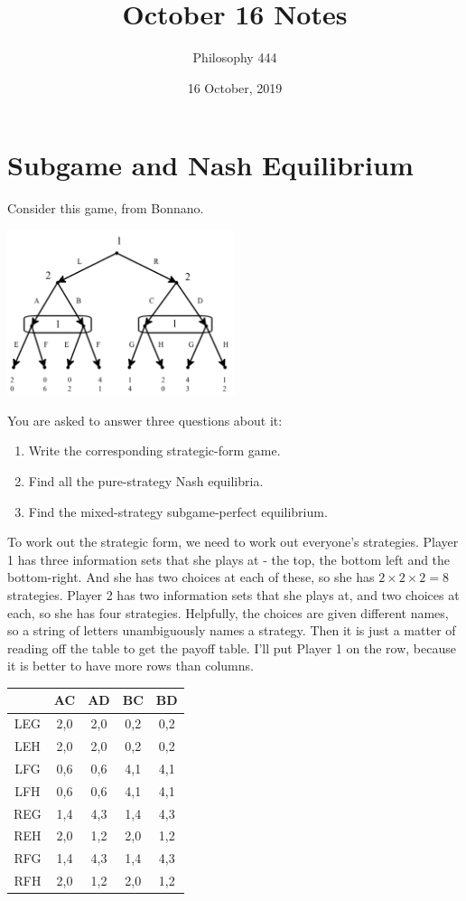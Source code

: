 \documentclass[11pt,]{article}
\title{October 16 Notes}
\author{Philosophy 444}
\date{16 October, 2019}
\providecommand{\tightlist}{%
  \setlength{\itemsep}{0pt}\setlength{\parskip}{0pt}}
\begin{document}
\maketitle

\hypertarget{subgame-and-nash-equilibrium}{%
\section{Subgame and Nash
Equilibrium}\label{subgame-and-nash-equilibrium}}

Consider this game, from Bonnano.

\includegraphics[width=0.5\textwidth,height=\textheight]{exercise7_7.png}

You are asked to answer three questions about it:

\begin{enumerate}
\def\labelenumi{(\alph{enumi})}
\tightlist
\item
  Write the corresponding strategic-form game.
\item
  Find all the pure-strategy Nash equilibria.
\item
  Find the mixed-strategy subgame-perfect equilibrium.
\end{enumerate}

To work out the strategic form, we need to work out everyone's
strategies. Player 1 has three information sets that she plays at - the
top, the bottom left and the bottom-right. And she has two choices at
each of these, so she has \(2 \times 2 \times 2 = 8\) strategies. Player
2 has two information sets that she plays at, and two choices at each,
so she has four strategies. Helpfully, the choices are given different
names, so a string of letters unambiguously names a strategy. Then it is
just a matter of reading off the table to get the payoff table. I'll put
Player 1 on the row, because it is better to have more rows than
columns.

\begin{longtable}[]{@{}ccccc@{}}
\toprule
& AC & AD & BC & BD\tabularnewline
\midrule
\endhead
LEG & 2,0 & 2,0 & 0,2 & 0,2\tabularnewline
LEH & 2,0 & 2,0 & 0,2 & 0,2\tabularnewline
LFG & 0,6 & 0,6 & 4,1 & 4,1\tabularnewline
LFH & 0,6 & 0,6 & 4,1 & 4,1\tabularnewline
REG & 1,4 & 4,3 & 1,4 & 4,3\tabularnewline
REH & 2,0 & 1,2 & 2,0 & 1,2\tabularnewline
RFG & 1,4 & 4,3 & 1,4 & 4,3\tabularnewline
RFH & 2,0 & 1,2 & 2,0 & 1,2\tabularnewline
\bottomrule
\end{longtable}
\end{document}

